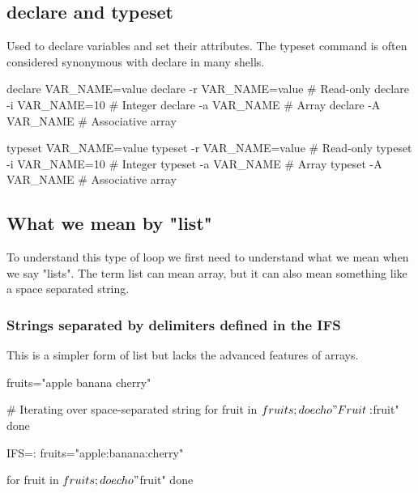 \documentclass{report}
\begin{document}
    \bigbreak \noindent 
    \subsection{declare and typeset}
    \bigbreak \noindent 
    Used to declare variables and set their attributes. The typeset command is often considered synonymous with declare in many shells.
    \bigbreak \noindent 
    \begin{bashcode}
        declare VAR_NAME=value
        declare -r VAR_NAME=value   # Read-only
        declare -i VAR_NAME=10      # Integer
        declare -a VAR_NAME         # Array
        declare -A VAR_NAME         # Associative array

        typeset VAR_NAME=value
        typeset -r VAR_NAME=value   # Read-only
        typeset -i VAR_NAME=10      # Integer
        typeset -a VAR_NAME         # Array
        typeset -A VAR_NAME         # Associative array
    \end{bashcode}


    \pagebreak 
    \bigbreak \noindent 
    \subsection{What we mean by "list"}
    \bigbreak \noindent 
    To understand this type of loop we first need to understand what we mean when we say "lists". 
    \bigbreak \noindent 
    The term list can mean array, but it can also mean something like a space separated string.
    \bigbreak \noindent 
    \subsubsection{Strings separated by delimiters defined in the IFS}
    \bigbreak \noindent 
    This is a simpler form of list but lacks the advanced features of arrays.
    \bigbreak \noindent 
    \begin{bashcode}
    fruits="apple banana cherry"

    # Iterating over space-separated string
    for fruit in $fruits; do
        echo "Fruit: $fruit"
    done

    IFS=:
    fruits="apple:banana:cherry"

    for fruit in $fruits; do
        echo "$fruit"
    done
    \end{bashcode}

    \bigbreak \noindent 
\end{document}
